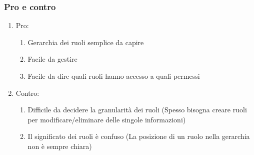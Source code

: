         \subsubsection{Pro e contro}
            \begin{enumerate}
                \item Pro:\begin{enumerate}
                    \item Gerarchia dei ruoli semplice da capire
                    \item Facile da gestire
                    \item Facile da dire quali ruoli hanno accesso a quali permessi
                \end{enumerate}
                \item Contro:\begin{enumerate}
                    \item Difficile da decidere la granularità dei ruoli (Spesso bisogna creare ruoli per modificare/eliminare delle singole informazioni)
                    \item Il significato dei ruoli è confuso (La posizione di un ruolo nella gerarchia non è sempre chiara)
                \end{enumerate}
            \end{enumerate}